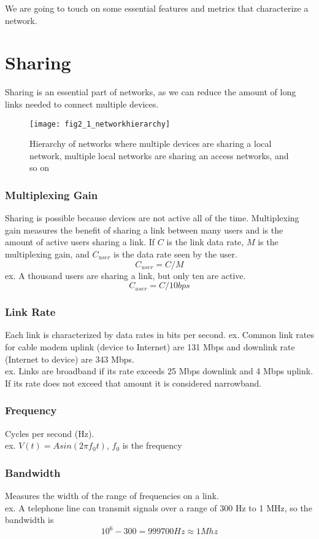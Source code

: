 
We are going to touch on some essential features and metrics that characterize a network.

\section{Sharing}
Sharing is an essential part of networks, as we can reduce the amount of long links needed to connect multiple devices. 
\begin{figure}[!htbp]
    \centering
    \texttt{[image: fig2\_1\_networkhierarchy]}
    \caption{Hierarchy of networks where multiple devices are sharing a local network, multiple local networks are sharing an access networks, and so on}
    \label{fig:Network_Hierarchy}
\end{figure}
\subsubsection*{Multiplexing Gain}
Sharing is possible because devices are not active all of the time. Multiplexing gain measures the benefit of sharing a link between many users and is the amount of active users sharing a link. If $C$ is the link data rate, $M$ is the multiplexing gain, and $C_{user}$ is the data rate seen by the user.
$$ C_{user} = C/M $$
ex. A thousand users are sharing a link, but only ten are active.
$$ C_{user} = C/10 bps$$
\subsubsection*{Link Rate}
Each link is characterized by data rates in bits per second.
ex. Common link rates for cable modem uplink (device to Internet) are 131 Mbps and downlink rate (Internet to device) are 343 Mbps. \\
ex. Links are broadband if its rate exceeds 25 Mbps
downlink and 4 Mbps uplink. If its rate does not exceed that amount it is considered narrowband.
\subsubsection*{Frequency}
Cycles per second (Hz). \\
ex. $V(t) = A sin(2 \pi f_0 t)$, $f_0$ is the frequency
\subsubsection*{Bandwidth}
Measures the width of the range of frequencies on a link.\\
ex. A telephone line can transmit signals over a range of 300 Hz to 1 MHz, so the bandwidth is $$10^6 - 300 = 999700 Hz \approx 1 Mhz$$
